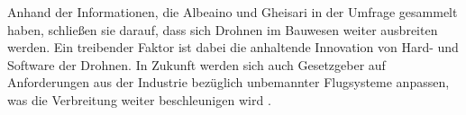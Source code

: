 
Anhand der Informationen, die Albeaino und Gheisari in der Umfrage gesammelt haben, schließen sie darauf, dass sich Drohnen im Bauwesen weiter ausbreiten werden.
Ein treibender Faktor ist dabei die anhaltende Innovation von Hard- und Software der Drohnen.
In Zukunft werden sich auch Gesetzgeber auf Anforderungen aus der Industrie bezüglich unbemannter Flugsysteme anpassen, was die Verbreitung weiter beschleunigen wird \cite[S. 104--105]{abaeano2021trends}.


